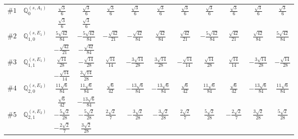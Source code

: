 \documentclass[fleqn,9pt,landscape]{jsarticle}
\begin{document}
\begin{center}
\begin{longtable}{lcccccccccc}
$ \#1\quad \mathbb{Q}_{0}^{(s,A_{1})} $ & $ \frac{\sqrt{3}}{6} $ & $ \frac{\sqrt{3}}{6} $ & $ \frac{\sqrt{3}}{6} $ & $ \frac{\sqrt{3}}{6} $ & $ \frac{\sqrt{3}}{6} $ & $ \frac{\sqrt{3}}{6} $ & $ \frac{\sqrt{3}}{6} $ & $ \frac{\sqrt{3}}{6} $ & $ \frac{\sqrt{3}}{6} $ & $ \frac{\sqrt{3}}{6} $ \\
& $ \frac{\sqrt{3}}{6} $ & $ \frac{\sqrt{3}}{6} $ & $  $ & $  $ & $  $ & $  $ & $  $ & $  $ & $  $ & $  $ \\ \hline
$ \#2\quad \mathbb{Q}_{1,0}^{(s,E_{1})} $ & $ \frac{5 \sqrt{42}}{84} $ & $ - \frac{5 \sqrt{42}}{84} $ & $ - \frac{\sqrt{42}}{21} $ & $ - \frac{\sqrt{42}}{84} $ & $ \frac{\sqrt{42}}{84} $ & $ \frac{\sqrt{42}}{21} $ & $ - \frac{5 \sqrt{42}}{84} $ & $ \frac{\sqrt{42}}{21} $ & $ \frac{\sqrt{42}}{84} $ & $ \frac{5 \sqrt{42}}{84} $ \\
& $ - \frac{\sqrt{42}}{21} $ & $ - \frac{\sqrt{42}}{84} $ & $  $ & $  $ & $  $ & $  $ & $  $ & $  $ & $  $ & $  $ \\ \hline
$ \#3\quad \mathbb{Q}_{1,1}^{(s,E_{1})} $ & $ \frac{\sqrt{14}}{28} $ & $ - \frac{\sqrt{14}}{28} $ & $ \frac{\sqrt{14}}{14} $ & $ - \frac{3 \sqrt{14}}{28} $ & $ \frac{3 \sqrt{14}}{28} $ & $ - \frac{\sqrt{14}}{14} $ & $ \frac{\sqrt{14}}{28} $ & $ \frac{\sqrt{14}}{14} $ & $ - \frac{3 \sqrt{14}}{28} $ & $ - \frac{\sqrt{14}}{28} $ \\
& $ - \frac{\sqrt{14}}{14} $ & $ \frac{3 \sqrt{14}}{28} $ & $  $ & $  $ & $  $ & $  $ & $  $ & $  $ & $  $ & $  $ \\ \hline
$ \#4\quad \mathbb{Q}_{2,0}^{(s,E_{2})} $ & $ \frac{11 \sqrt{6}}{84} $ & $ \frac{11 \sqrt{6}}{84} $ & $ \frac{\sqrt{6}}{42} $ & $ - \frac{13 \sqrt{6}}{84} $ & $ - \frac{13 \sqrt{6}}{84} $ & $ \frac{\sqrt{6}}{42} $ & $ \frac{11 \sqrt{6}}{84} $ & $ \frac{\sqrt{6}}{42} $ & $ - \frac{13 \sqrt{6}}{84} $ & $ \frac{11 \sqrt{6}}{84} $ \\
& $ \frac{\sqrt{6}}{42} $ & $ - \frac{13 \sqrt{6}}{84} $ & $  $ & $  $ & $  $ & $  $ & $  $ & $  $ & $  $ & $  $ \\ \hline
$ \#5\quad \mathbb{Q}_{2,1}^{(s,E_{2})} $ & $ - \frac{5 \sqrt{2}}{28} $ & $ - \frac{5 \sqrt{2}}{28} $ & $ \frac{2 \sqrt{2}}{7} $ & $ - \frac{3 \sqrt{2}}{28} $ & $ - \frac{3 \sqrt{2}}{28} $ & $ \frac{2 \sqrt{2}}{7} $ & $ \frac{5 \sqrt{2}}{28} $ & $ - \frac{2 \sqrt{2}}{7} $ & $ \frac{3 \sqrt{2}}{28} $ & $ \frac{5 \sqrt{2}}{28} $ \\
& $ - \frac{2 \sqrt{2}}{7} $ & $ \frac{3 \sqrt{2}}{28} $ & $  $ & $  $ & $  $ & $  $ & $  $ & $  $ & $  $ & $  $ \\ \hline

\end{longtable}
\end{center}
\end{document}
